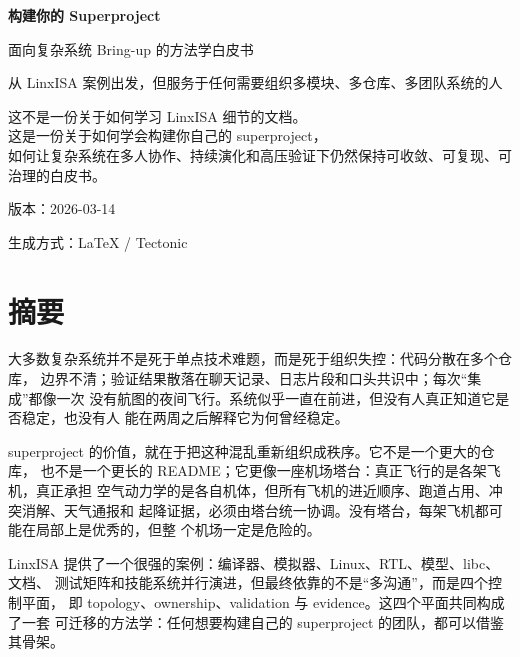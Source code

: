 \documentclass[UTF8,11pt,a4paper,oneside]{ctexbook}
\begin{document}
\frontmatter

\begin{titlepage}
  \centering
  \vspace*{2.6cm}
  {\Huge\bfseries 构建你的 Superproject\par}
  \vspace{0.8cm}
  {\LARGE 面向复杂系统 Bring-up 的方法学白皮书\par}
  \vspace{1.6cm}
  {\Large 从 LinxISA 案例出发，但服务于任何需要组织多模块、多仓库、多团队系统的人\par}
  \vspace{2.4cm}
  \begin{minipage}{0.82\textwidth}
    \centering
    \large
    这不是一份关于如何学习 LinxISA 细节的文档。\\
    这是一份关于如何学会构建你自己的 superproject，\\
    如何让复杂系统在多人协作、持续演化和高压验证下仍然保持可收敛、可复现、可治理的白皮书。
  \end{minipage}
  \vfill
  {\large 版本：2026-03-14\par}
  {\large 生成方式：LaTeX / Tectonic\par}
\end{titlepage}

\chapter*{摘要}

大多数复杂系统并不是死于单点技术难题，而是死于组织失控：代码分散在多个仓库，
边界不清；验证结果散落在聊天记录、日志片段和口头共识中；每次“集成”都像一次
没有航图的夜间飞行。系统似乎一直在前进，但没有人真正知道它是否稳定，也没有人
能在两周之后解释它为何曾经稳定。

superproject 的价值，就在于把这种混乱重新组织成秩序。它不是一个更大的仓库，
也不是一个更长的 README；它更像一座机场塔台：真正飞行的是各架飞机，真正承担
空气动力学的是各自机体，但所有飞机的进近顺序、跑道占用、冲突消解、天气通报和
起降证据，必须由塔台统一协调。没有塔台，每架飞机都可能在局部上是优秀的，但整
个机场一定是危险的。

LinxISA 提供了一个很强的案例：编译器、模拟器、Linux、RTL、模型、libc、文档、
测试矩阵和技能系统并行演进，但最终依靠的不是“多沟通”，而是四个控制平面，
即 topology、ownership、validation 与 evidence。这四个平面共同构成了一套
可迁移的方法学：任何想要构建自己的 superproject 的团队，都可以借鉴其骨架。
\end{document}
